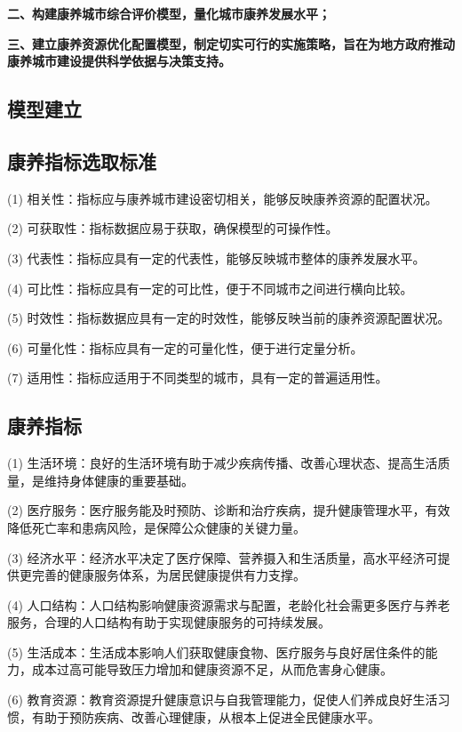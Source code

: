 \documentclass[12pt,a4paper]{article}
\begin{document}
\textbf{二、构建康养城市综合评价模型，量化城市康养发展水平；}

\textbf{三、建立康养资源优化配置模型，制定切实可行的实施策略，旨在为地方政府推动康养城市建设提供科学依据与决策支持。}

\begin{multicols}{2}

\section{模型建立}

\subsection{康养指标选取标准}

(1) 相关性：指标应与康养城市建设密切相关，能够反映康养资源的配置状况。

(2) 可获取性：指标数据应易于获取，确保模型的可操作性。

(3) 代表性：指标应具有一定的代表性，能够反映城市整体的康养发展水平。

(4) 可比性：指标应具有一定的可比性，便于不同城市之间进行横向比较。

(5) 时效性：指标数据应具有一定的时效性，能够反映当前的康养资源配置状况。

(6) 可量化性：指标应具有一定的可量化性，便于进行定量分析。

(7) 适用性：指标应适用于不同类型的城市，具有一定的普遍适用性。

\subsection{康养指标}

(1) 生活环境：良好的生活环境有助于减少疾病传播、改善心理状态、提高生活质量，是维持身体健康的重要基础。

(2) 医疗服务：医疗服务能及时预防、诊断和治疗疾病，提升健康管理水平，有效降低死亡率和患病风险，是保障公众健康的关键力量。

(3) 经济水平：经济水平决定了医疗保障、营养摄入和生活质量，高水平经济可提供更完善的健康服务体系，为居民健康提供有力支撑。

(4) 人口结构：人口结构影响健康资源需求与配置，老龄化社会需更多医疗与养老服务，合理的人口结构有助于实现健康服务的可持续发展。

(5) 生活成本：生活成本影响人们获取健康食物、医疗服务与良好居住条件的能力，成本过高可能导致压力增加和健康资源不足，从而危害身心健康。

(6) 教育资源：教育资源提升健康意识与自我管理能力，促使人们养成良好生活习惯，有助于预防疾病、改善心理健康，从根本上促进全民健康水平。


\end{multicols}
\end{document}
